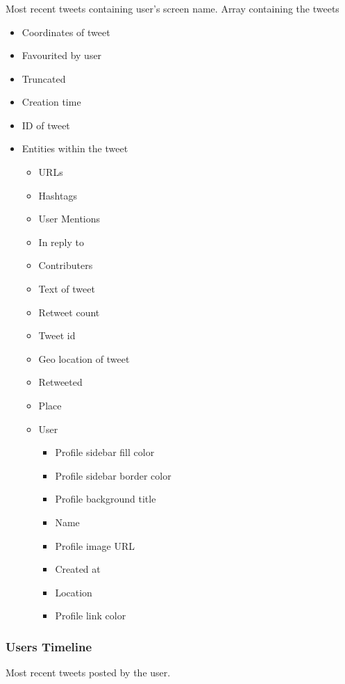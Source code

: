 \documentclass{article}
\begin{document}
		\subsubsection{}
			Most recent tweets containing user's screen name.
			Array containing the tweets
			\begin{itemize}
				\item Coordinates of tweet
				\item Favourited by user
				\item Truncated
				\item Creation time
				\item ID of tweet
				\item Entities within the tweet
					\begin{itemize}
						\item URLs
						\item Hashtags
						\item User Mentions
						\item In reply to
						\item Contributers
						\item Text of tweet
						\item Retweet count
						\item Tweet id
						\item Geo location of tweet
						\item Retweeted
						\item Place
						\item User
							\begin{itemize}
								\item Profile sidebar fill color
								\item Profile sidebar border color
								\item Profile background title
								\item Name
								\item Profile image URL
								\item Created at
								\item Location
								\item Profile link color

							\end{itemize}
					\end{itemize}
			\end{itemize}

		\subsubsection{Users Timeline}
			Most recent tweets posted by the user.
\end{document}
